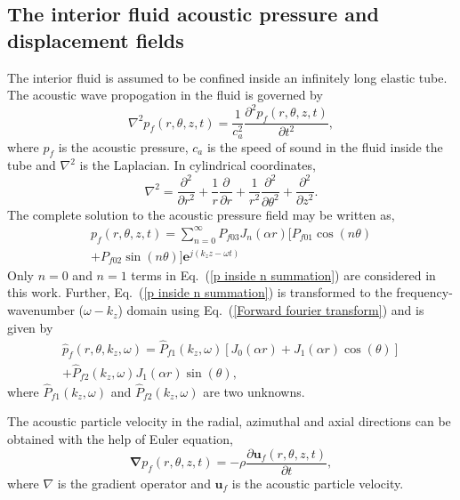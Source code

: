 \documentclass[twocolumn,10pt]{asme2ej}
\begin{document}
\subsection{The interior fluid acoustic pressure and displacement fields}\label{inside fluid modelling}
The interior fluid is assumed to be confined inside an infinitely long elastic tube. The acoustic wave propogation in the fluid is governed by
\begin{equation}\label{Acoustic wave equation 3d}
    \nabla^{2}p_f(r,\theta,z,t) = \frac{1}{c_a^{2}}\frac{\partial^{2} p_f(r,\theta,z,t)}{\partial t^{2}},
\end{equation}
where $p_{f}$ is the acoustic pressure, $c_a$ is the speed of sound in the fluid inside the tube and $\nabla^2$ is the Laplacian. In cylindrical coordinates,
\begin{equation}
    \nabla^2 = \frac{\partial^2}{\partial r^2} + \frac{1}{r}\frac{\partial}{\partial r} + \frac{1}{r^2}\frac{\partial^2}{\partial \theta^2} + \frac{\partial^2}{\partial z^2}.
\end{equation}
 The complete solution to the acoustic pressure field may be written as,
\begin{multline}\label{p inside n summation}
    p_f(r,\theta,z,t) =  \sum_{n=0}^{\infty}P_{f03} J_n(\alpha r)[P_{f01} \cos(n \theta)\\ + P_{f02} \sin(n \theta)]\mathbf{e}^{j(k_{z}z-\omega t)}
\end{multline}
Only $n=0$ and $n=1$ terms in Eq.~(\ref{p inside n summation}) are considered in this work. Further, Eq.~(\ref{p inside n summation}) is transformed to the frequency-wavenumber ($\omega-k_z$) domain using Eq.~(\ref{Forward fourier transform}) and is given by
\begin{multline}\label{P inside 3d}
    \hat{p}_f(r,\theta,k_z,\omega) = \hat{P}_{f1}(k_z,\omega)[J_0(\alpha r) + J_1(\alpha r)\cos(\theta)]\\ + \hat{P}_{f2}(k_z,\omega)J_1(\alpha r)\sin(\theta),
\end{multline}
where $\hat{P}_{f1}(k_z,\omega)$ and $\hat{P}_{f2}(k_z,\omega)$ are two unknowns. 

The acoustic particle velocity in the radial, azimuthal and axial directions can be obtained with the help of Euler equation,
\begin{equation}\label{Euler's equation}
    \pmb{\nabla} p_{f}(r,\theta,z,t) = -\rho \frac{\partial \mathbf{u}_f(r,\theta,z,t)}{\partial t},
\end{equation}
where $\nabla$ is the gradient operator and $\mathbf{u}_f$ is the acoustic particle velocity.
\end{document}
